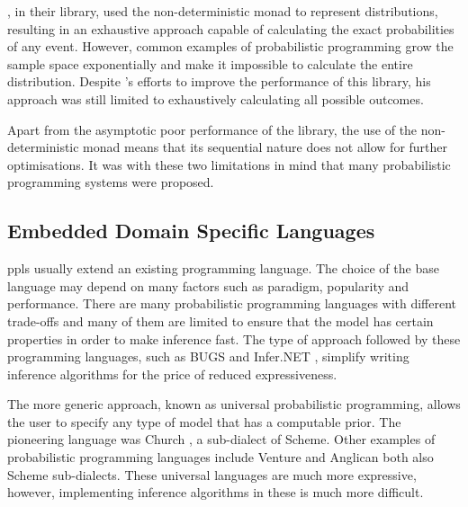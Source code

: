 \documentclass[
  oneside,
  11pt, a4paper,
  footinclude=true,
  headinclude=true,
  cleardoublepage=empty
]{scrbook}
\theoremstyle{definition}
\theoremstyle{definition}
\begin{document}
         \cite{erwig_kollmansberger_2006}, in their library, used the non-deterministic monad to represent distributions, resulting in an exhaustive approach capable of calculating the exact probabilities of any event. However, common examples of probabilistic programming grow the sample space exponentially and make it impossible to calculate the entire distribution. Despite \cite{larsen2011memory}'s efforts to improve the performance of this library, his approach was still limited to exhaustively calculating all possible outcomes.
                
         Apart from the asymptotic poor performance of the \cite{erwig_kollmansberger_2006} library, the use of the non-deterministic monad means that its sequential nature does not allow for further optimisations. It was with these two limitations in mind that many probabilistic programming systems were proposed.
        
        \subsection{Embedded Domain Specific Languages}\label{rel-work-edsl}
        
        \glspl{ppl} usually extend an existing programming language. The choice of the base language may depend on many factors such as paradigm, popularity and performance. There are many probabilistic programming languages with different trade-offs \citep{Scibior:2015:PPP:2887747.2804317} and many of them are limited to ensure that the model has certain properties in order to make inference fast. The type of approach followed by these programming languages, such as BUGS \citep{gilks1994language} and Infer.NET \citep{minkainfer}, simplify writing inference algorithms for the price of reduced expressiveness.
        
        The more generic approach, known as universal probabilistic programming, allows the user to specify any type of model that has a computable prior. The pioneering language was Church \citep{goodman2012church}, a sub-dialect of Scheme. Other examples of probabilistic programming languages include Venture and Anglican \citep{mansinghka2014venture, tolpin2015probabilistic} both also Scheme sub-dialects. These universal languages are much more expressive, however, implementing inference algorithms in these is much more difficult.
                
\end{document}

